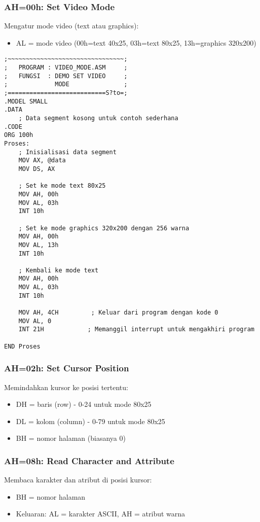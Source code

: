 \documentclass[../main.tex]{subfiles}
\begin{document}
            \subsubsection{AH=00h: Set Video Mode}
                Mengatur mode video (text atau graphics):
                \begin{itemize}
                    \item AL = mode video (00h=text 40x25, 03h=text 80x25, 13h=graphics 320x200)
                \end{itemize}

                \begin{lstlisting}[language={[x86masm]Assembler}, caption=Contoh Set Video Mode, label={lst:set-video-mode}]
;~~~~~~~~~~~~~~~~~~~~~~~~~~~~~~~~;
;   PROGRAM : VIDEO_MODE.ASM     ;
;   FUNGSI  : DEMO SET VIDEO     ;
;             MODE               ;
;===========================S?to=;
.MODEL SMALL
.DATA
    ; Data segment kosong untuk contoh sederhana
.CODE
ORG 100h
Proses:
    ; Inisialisasi data segment
    MOV AX, @data
    MOV DS, AX
    
    ; Set ke mode text 80x25
    MOV AH, 00h
    MOV AL, 03h
    INT 10h
    
    ; Set ke mode graphics 320x200 dengan 256 warna
    MOV AH, 00h
    MOV AL, 13h
    INT 10h
    
    ; Kembali ke mode text
    MOV AH, 00h
    MOV AL, 03h
    INT 10h
    
    MOV AH, 4CH         ; Keluar dari program dengan kode 0
    MOV AL, 0
    INT 21H            ; Memanggil interrupt untuk mengakhiri program

END Proses
                \end{lstlisting}

            \subsubsection{AH=02h: Set Cursor Position}
                Memindahkan kursor ke posisi tertentu:
                \begin{itemize}
                    \item DH = baris (row) - 0-24 untuk mode 80x25
                    \item DL = kolom (column) - 0-79 untuk mode 80x25
                    \item BH = nomor halaman (biasanya 0)
                \end{itemize}

            \subsubsection{AH=08h: Read Character and Attribute}
                Membaca karakter dan atribut di posisi kursor:
                \begin{itemize}
                    \item BH = nomor halaman
                    \item Keluaran: AL = karakter ASCII, AH = atribut warna
                \end{itemize}
\end{document}
